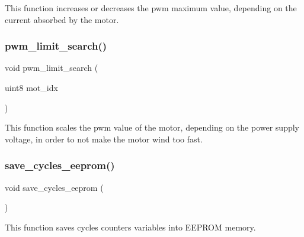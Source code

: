 This function increases or decreases the pwm maximum value, depending on the current absorbed by the motor. \mbox{\label{interruptions_8h_ac7305eeb40ebfb2c0d67725aa2e88f78}} 
\subsubsection{pwm\+\_\+limit\+\_\+search()}
{\footnotesize\ttfamily void pwm\+\_\+limit\+\_\+search (\begin{DoxyParamCaption}\item[{uint8}]{mot\+\_\+idx }\end{DoxyParamCaption})}

This function scales the pwm value of the motor, depending on the power supply voltage, in order to not make the motor wind too fast. \mbox{\label{interruptions_8h_ad86170580c30277d97216739e8508a13}} 
\subsubsection{save\+\_\+cycles\+\_\+eeprom()}
{\footnotesize\ttfamily void save\+\_\+cycles\+\_\+eeprom (\begin{DoxyParamCaption}{ }\end{DoxyParamCaption})}

This function saves cycles counters variables into E\+E\+P\+R\+OM memory. 